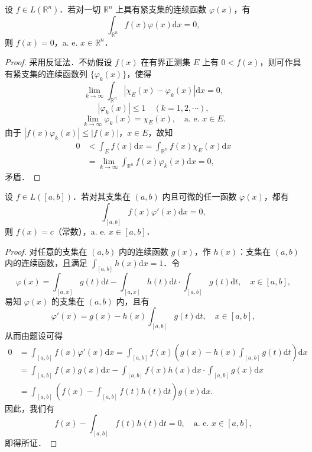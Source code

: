 \documentclass[../../main.tex]{subfiles}%
\begin{document}
\begin{example}
设 \( f \in L(\mathbb{R}^n) \)．若对一切 \( \mathbb{R}^n \) 上具有紧支集的连续函数 \( \varphi(x) \)，有
\[
\int_{\mathbb{R}^n} f(x)\varphi(x) \mathrm{d}x = 0,
\]
则 \( f(x) = 0 \)，a. e. \( x \in \mathbb{R}^n \)．
\end{example}
\begin{proof}

采用反证法．不妨假设 \( f(x) \) 在有界正测集 \( E \) 上有 \( 0 < f(x) \)，则可作具有紧支集的连续函数列 \( \{ \varphi_k(x) \} \)，使得
\[
\lim_{k \to \infty} \int_{\mathbb{R}^n} |\chi_E(x) - \varphi_k(x)| \mathrm{d}x = 0,
\]
\[
|\varphi_k(x)| \leqslant 1 \quad (k = 1,2,\cdots),
\]
\[
\lim_{k \to \infty} \varphi_k(x) = \chi_E(x), \quad \text{a. e. } x \in E.
\]
由于 \( |f(x)\varphi_k(x)| \leqslant |f(x)| \)，\( x \in E \)，故知
\begin{align*}
0 &< \int_E f(x) \mathrm{d}x = \int_{\mathbb{R}^n} f(x)\chi_E(x) \mathrm{d}x \\
&= \lim_{k \to \infty} \int_{\mathbb{R}^n} f(x)\varphi_k(x) \mathrm{d}x = 0,
\end{align*}
矛盾．

\end{proof}

\begin{example}
设 \( f \in L([a,b]) \)．若对其支集在 \( (a,b) \) 内且可微的任一函数 \( \varphi(x) \)，都有
\[
\int_{[a,b]} f(x)\varphi'(x) \mathrm{d}x = 0,
\]
则 \( f(x) = c \)（常数），a. e. \( x \in [a,b] \)．
\end{example}
\begin{proof}

对任意的支集在 \( (a,b) \) 内的连续函数 \( g(x) \)，作 \( h(x) \)：支集在 \( (a,b) \) 内的连续函数，且满足 \( \int_{[a,b]} h(x) \mathrm{d}x = 1 \)．令
\[
\varphi(x) = \int_{[a,x]} g(t) \mathrm{d}t - \int_{[a,x]} h(t) \mathrm{d}t \cdot \int_{[a,b]} g(t) \mathrm{d}t, \quad x \in [a,b],
\]
易知 \( \varphi(x) \) 的支集在 \( (a,b) \) 内，且有
\[
\varphi'(x) = g(x) - h(x)\int_{[a,b]} g(t) \mathrm{d}t, \quad x \in [a,b],
\]
从而由题设可得
\begin{align*}
0 &= \int_{[a,b]} f(x)\varphi'(x) \mathrm{d}x = \int_{[a,b]} f(x)\left( g(x) - h(x)\int_{[a,b]} g(t) \mathrm{d}t \right) \mathrm{d}x \\
&= \int_{[a,b]} f(x)g(x) \mathrm{d}x - \int_{[a,b]} f(x)h(x) \mathrm{d}x \cdot \int_{[a,b]} g(x) \mathrm{d}x \\
&= \int_{[a,b]} \left( f(x) - \int_{[a,b]} f(t)h(t) \mathrm{d}t \right) g(x) \mathrm{d}x.
\end{align*}
因此，我们有
\[
f(x) - \int_{[a,b]} f(t)h(t) \mathrm{d}t = 0, \quad \text{a. e. } x \in [a,b],
\]
即得所证．

\end{proof}
\end{document}

